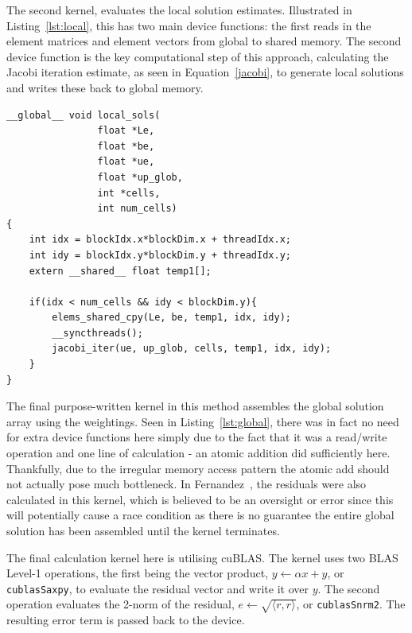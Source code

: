 The second kernel, evaluates the local solution estimates. Illustrated in Listing~\ref{lst:local}, this has two main device functions: the first reads in the element matrices and element vectors from global to shared memory. The second device function is the key computational step of this approach, calculating the Jacobi iteration estimate, as seen in Equation~\eqref{jacobi}, to generate local solutions and writes these back to global memory.
\begin{lstlisting}[style=cppStyle, caption = {Kernel to evaluate local solutions in FEMSES using Jacobi iteration.}, label={lst:local}]
__global__ void local_sols(
                float *Le,
                float *be,
                float *ue,
                float *up_glob,
                int *cells,
                int num_cells)
{
    int idx = blockIdx.x*blockDim.x + threadIdx.x;
    int idy = blockIdx.y*blockDim.y + threadIdx.y;
    extern __shared__ float temp1[]; 

    if(idx < num_cells && idy < blockDim.y){
        elems_shared_cpy(Le, be, temp1, idx, idy);
        __syncthreads();
        jacobi_iter(ue, up_glob, cells, temp1, idx, idy);
    }
}
\end{lstlisting}

The final purpose-written kernel in this method assembles the global solution array using the weightings. Seen in Listing~\ref{lst:global}, there was in fact no need for extra device functions here simply due to the fact that it was a read/write operation and one line of calculation - an atomic addition did sufficiently here. Thankfully, due to the irregular memory access pattern the atomic add should not actually pose much bottleneck. In Fernandez~\cite{femses}, the residuals were also calculated in this kernel, which is believed to be an oversight or error since this will potentially cause a race  condition as there is no guarantee the entire global solution has been assembled until the kernel terminates.

The final calculation kernel here is utilising cuBLAS. The kernel uses two BLAS Level-1 operations, the first being the vector product, $y \leftarrow \alpha x + y$, or \texttt{cublasSaxpy}, to evaluate the residual vector and write it over $y$. The second operation evaluates the 2-norm of the residual, $e \leftarrow \sqrt{\langle r, r\rangle}$, or \texttt{cublasSnrm2}. The resulting error term is passed back to the device.

